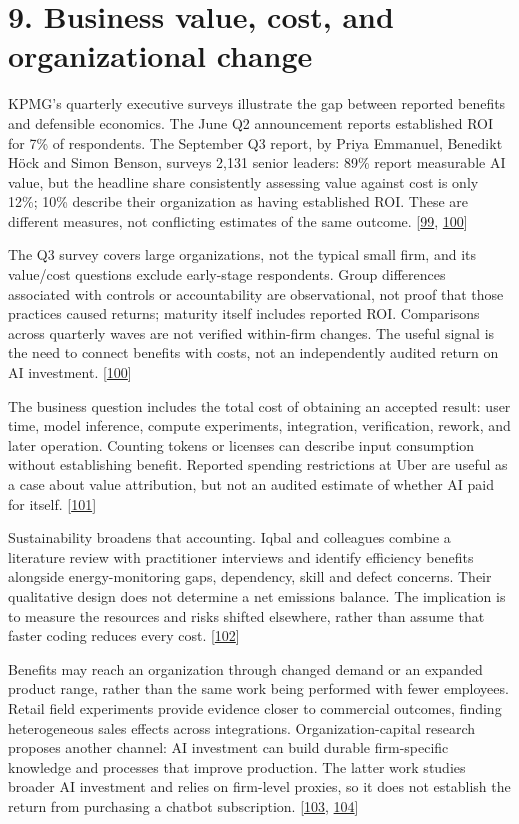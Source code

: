 \section*{9. Business value, cost, and organizational change}
KPMG's quarterly executive surveys illustrate the gap between reported benefits and defensible economics. The June Q2 announcement reports established ROI for 7\% of respondents. The September Q3 report, by Priya Emmanuel, Benedikt Höck and Simon Benson, surveys 2,131 senior leaders: 89\% report measurable AI value, but the headline share consistently assessing value against cost is only 12\%; 10\% describe their organization as having established ROI. These are different measures, not conflicting estimates of the same outcome. [\hyperlink{ref-ref-fee88585ea}{99}, \hyperlink{ref-kpmgpulseq32026}{100}]


The Q3 survey covers large organizations, not the typical small firm, and its value/cost questions exclude early-stage respondents. Group differences associated with controls or accountability are observational, not proof that those practices caused returns; maturity itself includes reported ROI. Comparisons across quarterly waves are not verified within-firm changes. The useful signal is the need to connect benefits with costs, not an independently audited return on AI investment. [\hyperlink{ref-kpmgpulseq32026}{100}]


The business question includes the total cost of obtaining an accepted result: user time, model inference, compute experiments, integration, verification, rework, and later operation. Counting tokens or licenses can describe input consumption without establishing benefit. Reported spending restrictions at Uber are useful as a case about value attribution, but not an audited estimate of whether AI paid for itself. [\hyperlink{ref-uber2026}{101}]


Sustainability broadens that accounting. Iqbal and colleagues combine a literature review with practitioner interviews and identify efficiency benefits alongside energy-monitoring gaps, dependency, skill and defect concerns. Their qualitative design does not determine a net emissions balance. The implication is to measure the resources and risks shifted elsewhere, rather than assume that faster coding reduces every cost. [\hyperlink{ref-iqbal2026}{102}]


Benefits may reach an organization through changed demand or an expanded product range, rather than the same work being performed with fewer employees. Retail field experiments provide evidence closer to commercial outcomes, finding heterogeneous sales effects across integrations. Organization-capital research proposes another channel: AI investment can build durable firm-specific knowledge and processes that improve production. The latter work studies broader AI investment and relies on firm-level proxies, so it does not establish the return from purchasing a chatbot subscription. [\hyperlink{ref-retail2025}{103}, \hyperlink{ref-babina2026}{104}]


